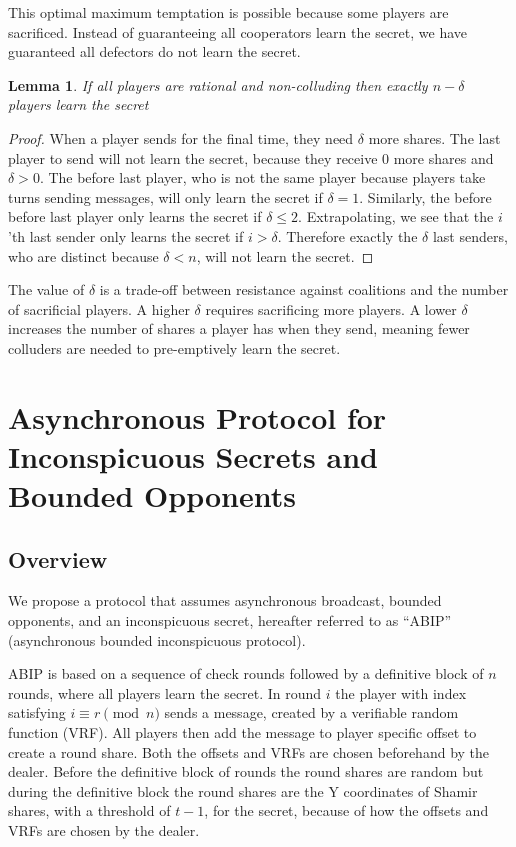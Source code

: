 \documentclass{dalcsthesis}
\newtheorem{lemma}{Lemma}
\begin{document}
This optimal maximum temptation is possible because some players are sacrificed. Instead of guaranteeing all cooperators learn the secret, we have guaranteed all defectors do not learn the secret.

\begin{lemma} If all players are rational and non-colluding then exactly $n - \delta$ players learn the secret \end{lemma}
\begin{proof}
When a player sends for the final time, they need $\delta$ more shares. The last player to send will not learn the secret, because they receive 0 more shares and $\delta > 0$. The before last player, who is not the same player because players take turns sending messages, will only learn the secret if $\delta = 1$. Similarly, the before before last player only learns the secret if $\delta \leq 2$. Extrapolating, we see that the $i$'th last sender only learns the secret if $i > \delta$. Therefore exactly the $\delta$ last senders, who are distinct because $\delta < n$, will not learn the secret.
\end{proof}

The value of $\delta$ is a trade-off between resistance against coalitions and the number of sacrificial players. A higher $\delta$ requires sacrificing more players. A lower $\delta$ increases the number of shares a player has when they send, meaning fewer colluders are needed to pre-emptively learn the secret.


\section{Asynchronous Protocol for Inconspicuous Secrets and Bounded Opponents}

\subsection{Overview}

We propose a protocol that assumes asynchronous broadcast, bounded opponents, and an inconspicuous secret, hereafter referred to as ``ABIP'' (asynchronous bounded inconspicuous protocol).

ABIP is based on a sequence of check rounds followed by a definitive block of $n$ rounds, where all players learn the secret. In round $i$ the player with index satisfying $i \equiv r \pmod{n}$ sends a message, created by a verifiable random function (VRF). All players then add the message to player specific offset to create a round share. Both the offsets and VRFs are chosen beforehand by the dealer. Before the definitive block of rounds the round shares are random but during the definitive block the round shares are the Y coordinates of Shamir shares, with a threshold of $t-1$, for the secret, because of how the offsets and VRFs are chosen by the dealer.
\end{document}
